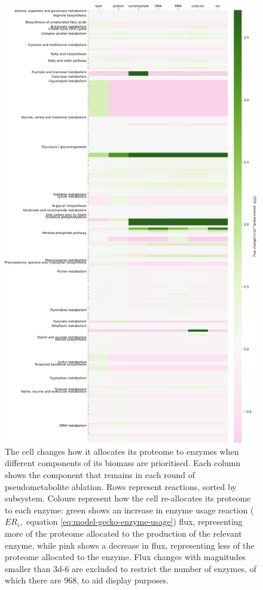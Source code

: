 \begin{figure}
  \centering
  \includegraphics[width=.8\linewidth]{abl_vs_enz_use_plots_adapted}
  \caption{
    The cell changes how it allocates its proteome to enzymes when different components of its biomass are prioritised.
    Each column shows the component that remains in each round of pseudometabolite ablation.
    Rows represent reactions, sorted by subsystem.
    Colours represent how the cell re-allocates its proteome to each enzyme: green shows an increase in enzyme usage reaction ($ER_{i}$,~equation \ref{eq:model-gecko-enzyme-usage}) flux, representing more of the proteome allocated to the production of the relevant enzyme, while pink shows a decrease in flux, representing less of the proteome allocated to the enzyme.
    Flux changes with magnitudes smaller than \SI{3d-6}{\mmolgdw} are excluded to restrict the number of enzymes, of which there are 968, to aid display purposes.
  }
  \label{fig:model-ablate-enz-use}
\end{figure}

